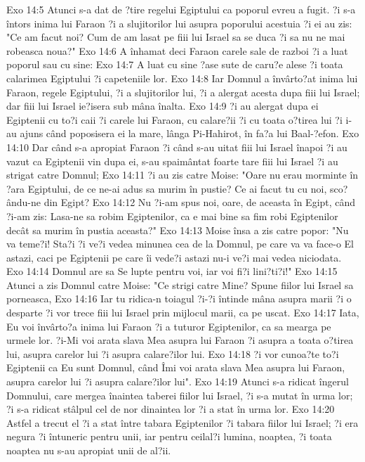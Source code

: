 Exo 14:5  Atunci s-a dat de ?tire regelui Egiptului ca poporul evreu a fugit. ?i s-a întors inima lui Faraon ?i a slujitorilor lui asupra poporului acestuia ?i ei au zis: "Ce am facut noi? Cum de am lasat pe fiii lui Israel sa se duca ?i sa nu ne mai robeasca noua?"
Exo 14:6  A înhamat deci Faraon carele sale de razboi ?i a luat poporul sau cu sine:
Exo 14:7  A luat cu sine ?ase sute de caru?e alese ?i toata calarimea Egiptului ?i capeteniile lor.
Exo 14:8  Iar Domnul a învârto?at inima lui Faraon, regele Egiptului, ?i a slujitorilor lui, ?i a alergat acesta dupa fiii lui Israel; dar fiii lui Israel ie?isera sub mâna înalta.
Exo 14:9  ?i au alergat dupa ei Egiptenii cu to?i caii ?i carele lui Faraon, cu calare?ii ?i cu toata o?tirea lui ?i i-au ajuns când poposisera ei la mare, lânga Pi-Hahirot, în fa?a lui Baal-?efon.
Exo 14:10  Dar când s-a apropiat Faraon ?i când s-au uitat fiii lui Israel înapoi ?i au vazut ca Egiptenii vin dupa ei, s-au spaimântat foarte tare fiii lui Israel ?i au strigat catre Domnul;
Exo 14:11  ?i au zis catre Moise: "Oare nu erau morminte în ?ara Egiptului, de ce ne-ai adus sa murim în pustie? Ce ai facut tu cu noi, sco?ându-ne din Egipt?
Exo 14:12  Nu ?i-am spus noi, oare, de aceasta în Egipt, când ?i-am zis: Lasa-ne sa robim Egiptenilor, ca e mai bine sa fim robi Egiptenilor decât sa murim în pustia aceasta?"
Exo 14:13  Moise însa a zis catre popor: "Nu va teme?i! Sta?i ?i ve?i vedea minunea cea de la Domnul, pe care va va face-o El astazi, caci pe Egiptenii pe care îi vede?i astazi nu-i ve?i mai vedea niciodata.
Exo 14:14  Domnul are sa Se lupte pentru voi, iar voi fi?i lini?ti?i!"
Exo 14:15  Atunci a zis Domnul catre Moise: "Ce strigi catre Mine? Spune fiilor lui Israel sa porneasca,
Exo 14:16  Iar tu ridica-n toiagul ?i-?i întinde mâna asupra marii ?i o desparte ?i vor trece fiii lui Israel prin mijlocul marii, ca pe uscat.
Exo 14:17  Iata, Eu voi învârto?a inima lui Faraon ?i a tuturor Egiptenilor, ca sa mearga pe urmele lor. ?i-Mi voi arata slava Mea asupra lui Faraon ?i asupra a toata o?tirea lui, asupra carelor lui ?i asupra calare?ilor lui.
Exo 14:18  ?i vor cunoa?te to?i Egiptenii ca Eu sunt Domnul, când Îmi voi arata slava Mea asupra lui Faraon, asupra carelor lui ?i asupra calare?ilor lui".
Exo 14:19  Atunci s-a ridicat îngerul Domnului, care mergea înaintea taberei fiilor lui Israel, ?i s-a mutat în urma lor; ?i s-a ridicat stâlpul cel de nor dinaintea lor ?i a stat în urma lor.
Exo 14:20  Astfel a trecut el ?i a stat între tabara Egiptenilor ?i tabara fiilor lui Israel; ?i era negura ?i întuneric pentru unii, iar pentru ceilal?i lumina, noaptea, ?i toata noaptea nu s-au apropiat unii de al?ii.
